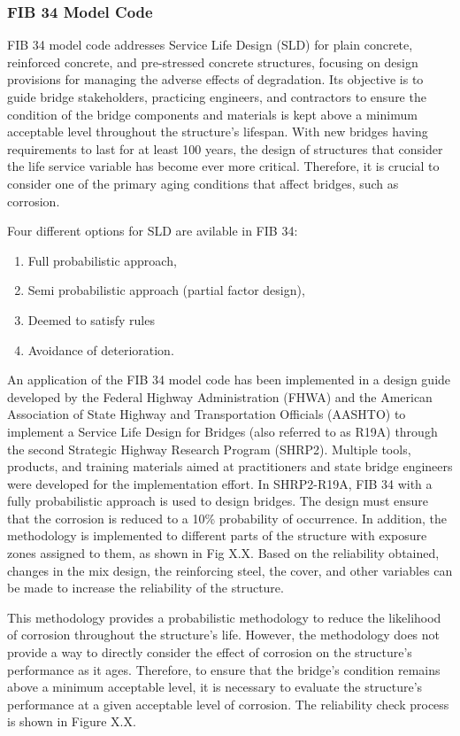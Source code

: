 \subsubsection{FIB 34 Model Code}
FIB 34 model code addresses Service Life Design (SLD) for plain concrete, reinforced concrete, and pre-stressed concrete structures, focusing on design provisions for managing the adverse effects of degradation. Its objective is to guide bridge stakeholders, practicing engineers, and contractors to ensure the condition of the bridge components and materials is kept above a minimum acceptable level throughout the structure's lifespan. With new bridges having requirements to last for at least 100 years, the design of structures that consider the life service variable has become ever more critical. Therefore, it is crucial to consider one of the primary aging conditions that affect bridges, such as corrosion.

Four different options for SLD are avilable in FIB 34:
\begin{enumerate}
    \item Full probabilistic approach,
    \item Semi probabilistic approach (partial factor design),
    \item Deemed to satisfy rules
    \item Avoidance of deterioration.
\end{enumerate}

An application of the FIB 34 model code has been implemented in a design guide developed by the Federal Highway Administration (FHWA) and the  American Association of State Highway and Transportation Officials (AASHTO) to implement a Service Life Design for Bridges (also referred to as R19A) through the second Strategic Highway Research Program (SHRP2)\cite{SHRP22019}. Multiple tools, products, and training materials aimed at practitioners and state bridge engineers were developed for the implementation effort. In SHRP2-R19A, FIB 34 with a fully probabilistic approach is used to design bridges. The design must ensure that the corrosion is reduced to a 10\% probability of occurrence. In addition, the methodology is implemented to different parts of the structure with exposure zones assigned to them, as shown in Fig X.X. Based on the reliability obtained, changes in the mix design, the reinforcing steel, the cover, and other variables can be made to increase the reliability of the structure. 

This methodology provides a probabilistic methodology to reduce the likelihood of corrosion throughout the structure's life. However, the methodology does not provide a way to directly consider the effect of corrosion on the structure's performance as it ages. Therefore, to ensure that the bridge's condition remains above a minimum acceptable level, it is necessary to evaluate the structure's performance at a given acceptable level of corrosion. The reliability check process is shown in Figure X.X.

